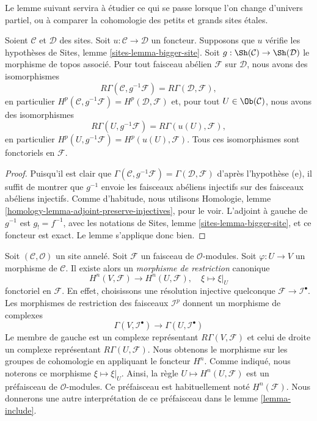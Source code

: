\noindent
Le lemme suivant servira à étudier ce qui se passe lorsque l'on change
d'univers partiel, ou à comparer la cohomologie des petits et grands sites
\'etales.

\begin{lemma}
\label{lemma-cohomology-bigger-site}
Soient $\mathcal{C}$ et $\mathcal{D}$ des sites.
Soit $u : \mathcal{C} \to \mathcal{D}$ un foncteur.
Supposons que $u$ vérifie les hypothèses de
Sites, lemme \ref{sites-lemma-bigger-site}.
Soit $g : \Sh(\mathcal{C}) \to \Sh(\mathcal{D})$
le morphisme de topos associé.
Pour tout faisceau abélien $\mathcal{F}$ sur $\mathcal{D}$, nous avons des
isomorphismes
$$
R\Gamma(\mathcal{C}, g^{-1}\mathcal{F}) = R\Gamma(\mathcal{D}, \mathcal{F}),
$$
en particulier
$H^p(\mathcal{C}, g^{-1}\mathcal{F}) = H^p(\mathcal{D}, \mathcal{F})$
et, pour tout $U \in \Ob(\mathcal{C})$, nous avons des isomorphismes
$$
R\Gamma(U, g^{-1}\mathcal{F}) = R\Gamma(u(U), \mathcal{F}),
$$
en particulier
$H^p(U, g^{-1}\mathcal{F}) = H^p(u(U), \mathcal{F})$. Tous ces
isomorphismes sont fonctoriels en $\mathcal{F}$.
\end{lemma}

\begin{proof}
Puisqu'il est clair que
$\Gamma(\mathcal{C}, g^{-1}\mathcal{F}) = \Gamma(\mathcal{D}, \mathcal{F})$
d'après l'hypothèse (e), il suffit de montrer que $g^{-1}$ envoie les faisceaux
abéliens injectifs sur des faisceaux abéliens injectifs. Comme d'habitude, nous utilisons
Homologie, lemme \ref{homology-lemma-adjoint-preserve-injectives},
pour le voir. L'adjoint à gauche de $g^{-1}$ est $g_! = f^{-1}$, avec les
notations de
Sites, lemme \ref{sites-lemma-bigger-site},
et ce foncteur est exact. Le lemme s'applique donc bien.
\end{proof}

\noindent
Soit $(\mathcal{C}, \mathcal{O})$ un site annelé.
Soit $\mathcal{F}$ un faisceau de $\mathcal{O}$-modules.
Soit $\varphi : U \to V$ un morphisme de $\mathcal{C}$.
Il existe alors un {\it morphisme de restriction} canonique
\begin{equation}
\label{equation-restriction-mapping}
H^n(V, \mathcal{F})
\longrightarrow
H^n(U, \mathcal{F}), \quad
\xi \longmapsto \xi|_U
\end{equation}
fonctoriel en $\mathcal{F}$. En effet, choisissons une résolution
injective quelconque $\mathcal{F} \to \mathcal{I}^\bullet$. Les morphismes de
restriction des faisceaux $\mathcal{I}^p$ donnent un morphisme de complexes
$$
\Gamma(V, \mathcal{I}^\bullet)
\longrightarrow
\Gamma(U, \mathcal{I}^\bullet)
$$
Le membre de gauche est un complexe représentant $R\Gamma(V, \mathcal{F})$
et celui de droite un complexe représentant $R\Gamma(U, \mathcal{F})$.
Nous obtenons le morphisme sur les groupes de cohomologie en appliquant le foncteur $H^n$.
Comme indiqué, nous noterons ce morphisme $\xi \mapsto \xi|_U$.
Ainsi, la règle $U \mapsto H^n(U, \mathcal{F})$ est un préfaisceau de
$\mathcal{O}$-modules. Ce préfaisceau est habituellement noté
$\underline{H}^n(\mathcal{F})$. Nous donnerons une autre interprétation
de ce préfaisceau dans le lemme \ref{lemma-include}.

